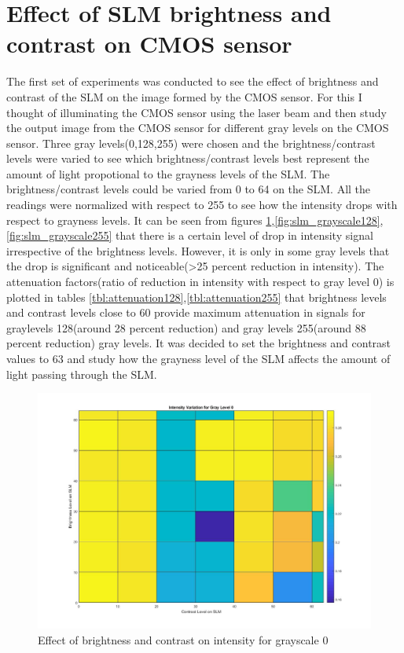 \section{Effect of SLM brightness and contrast on CMOS sensor}
The first set of experiments was conducted to see the effect of brightness and contrast of the SLM on the image formed by the CMOS sensor. For this I thought of illuminating the CMOS sensor using the laser beam and then study the output image from the CMOS sensor for different gray levels on the CMOS sensor. Three gray levels(0,128,255) were chosen and the brightness/contrast levels were varied to see which brightness/contrast levels best represent the amount of light propotional to the grayness levels of the SLM. The brightness/contrast levels could be varied from 0 to 64 on the SLM. All the readings were normalized with respect to 255 to see how the intensity drops with respect to grayness levels. It can be seen from figures \ref{fig:slm_grayscale0},\ref{fig:slm_grayscale128},\ref{fig:slm_grayscale255} that there is a certain level of drop in intensity signal irrespective of the brightness levels. However, it is only in some gray levels that the drop is significant and noticeable(>25 percent reduction in intensity). The attenuation factors(ratio of reduction in intensity with respect to gray level 0) is plotted in tables \ref{tbl:attenuation128},\ref{tbl:attenuation255} that brightness levels and contrast levels close to 60 provide maximum attenuation in signals for graylevels 128(around 28 percent reduction) and gray levels 255(around 88 percent reduction) gray levels. It was decided to set the brightness and contrast values to 63 and study how the grayness level of the SLM affects the amount of light passing through the SLM.
\begin{figure}[h]
\centering
\includegraphics[width = \linewidth]{pics/slm/slmgrayscale0.jpg}
\caption{Effect of brightness and contrast on intensity for grayscale 0}
\label{fig:slm_grayscale0}
\end{figure}
